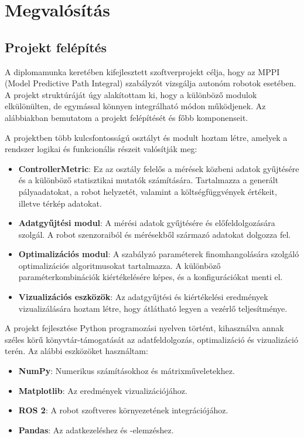 \chapter{Megvalósítás}

\section{Projekt felépítés}
A diplomamunka keretében kifejlesztett szoftverprojekt célja, hogy az MPPI (Model Predictive Path Integral) szabályzót vizsgálja autonóm robotok esetében. A projekt struktúráját úgy alakítottam ki, hogy a különböző modulok elkülönülten, de egymással könnyen integrálható módon működjenek. Az alábbiakban bemutatom a projekt felépítését és főbb komponenseit.

A projektben több kulcsfontosságú osztályt és modult hoztam létre, amelyek a rendszer logikai és funkcionális részeit valósítják meg:
\begin{itemize}
    \item \textbf{ControllerMetric}: Ez az osztály felelős a mérések közbeni adatok gyűjtésére és a különböző statisztikai mutatók számítására. Tartalmazza a generált pályaadatokat, a robot helyzetét, valamint a költségfüggvények értékeit, illetve térkép adatokat.
    \item \textbf{Adatgyűjtési modul}: A mérési adatok gyűjtésére és előfeldolgozására szolgál. A robot szenzoraiból és mérésekből származó adatokat dolgozza fel.
    \item \textbf{Optimalizációs modul}: A szabályzó paraméterek finomhangolására szolgáló optimalizációs algoritmusokat tartalmazza. A különböző paraméterkombinációk kiértékelésére képes, és a konfigurációkat menti el.
    \item \textbf{Vizualizációs eszközök}: Az adatgyűjtési és kiértékelési eredmények vizualizálására hoztam létre, hogy átlátható legyen a vezérlő teljesítménye.
\end{itemize}

A projekt fejlesztése Python programozási nyelven történt, kihasználva annak széles körű könyvtár-támogatását az adatfeldolgozás, optimalizáció és vizualizáció terén. Az alábbi eszközöket használtam:
\begin{itemize}
    \item \textbf{NumPy}: Numerikus számításokhoz és mátrixműveletekhez.
    \item \textbf{Matplotlib}: Az eredmények vizualizációjához.
    \item \textbf{ROS 2}: A robot szoftveres környezetének integrációjához.
    \item \textbf{Pandas}: Az adatkezeléshez és -elemzéshez.
\end{itemize}

